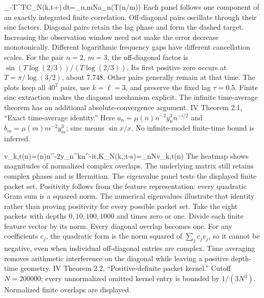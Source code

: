 {\int_{-T}^{T}C_N(k,t+\tau)\,dt=\sum_{n,m\le N}a_n\!\bigl(T\log(n/m)\bigr)}
{Each panel follows one component of an exactly integrated finite correlation. Off-diagonal pairs oscillate through their sinc factors. Diagonal pairs retain the lag phase and form the dashed target. Increasing the observation window need not make the error decrease monotonically. Different logarithmic frequency gaps have different cancellation scales.}
{For the pair $n=2$, $m=3$, the off-diagonal factor is $\sin(T\log(2/3))/(T\log(2/3))$. Its first positive zero occurs at $T=\pi/\log(3/2)$, about $7.748$. Other pairs generally remain at that time. The plots keep all $40^2$ pairs, use $k=\ell=3$, and preserve the fixed lag $\tau=0.5$.}
{Finite sinc extraction makes the diagonal mechanism explicit. The infinite time-average theorem has an additional absolute-convergence argument.}
{IV Theorem 2.1, ``Exact time-average identity.'' Here $a_n=\mu(n)n^{-2}y_n^3n^{-i/2}$ and $b_m=\mu(m)m^{-2}y_m^3$; sinc means $\sin x/x$. No infinite-model finite-time bound is inferred.}

{v_{k,t}(n)=\mu(n)n^{-2}y_n^kn^{-it},\qquad K_N(k,\ell;t-s)=\sum_{n\le N}v_{k,t}(n)}
{The heatmap shows magnitudes of normalized complex overlaps. The underlying matrix still retains complex phases and is Hermitian. The eigenvalue panel tests the displayed finite packet set. Positivity follows from the feature representation: every quadratic Gram sum is a squared norm. The numerical eigenvalues illustrate that identity rather than proving positivity for every possible packet set.}
{Take the eight packets with depths $0,10,100,1000$ and times zero or one. Divide each finite feature vector by its norm. Every diagonal overlap becomes one. For any coefficients $c_j$, the quadratic form is the norm squared of $\sum_jc_jv_j$, so it cannot be negative, even when individual off-diagonal entries are complex.}
{Time averaging removes arithmetic interference on the diagonal while leaving a positive depth-time geometry.}
{IV Theorem 2.2, ``Positive-definite packet kernel.'' Cutoff $N=200000$; every unnormalized omitted kernel entry is bounded by $1/(3N^3)$. Normalized finite overlaps are displayed.}

